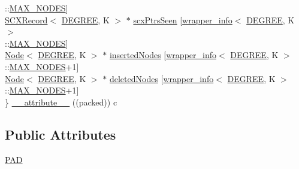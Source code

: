 \begin{DoxyCompactItemize}
\begin{tabbing}
\>\>::\hyperlink{scxrecord_8h_abd2aacdca9cb2a1a30f3392256b96ea3}{MAX\_NODES}\mbox{]}\\
\>\hyperlink{structabtree__ns_1_1SCXRecord}{SCXRecord}$<$ \hyperlink{brown__sigouin__abtree__kcas_2adapter_8h_a5d88b17d70c985f2f2b8e987037fd6dd}{DEGREE}, K $>$ $\ast$ \hyperlink{structabtree__ns_1_1SCXRecord_a97a778327a41a8e715c36a22332832cb}{scxPtrsSeen} \mbox{[}\hyperlink{classabtree__ns_1_1wrapper__info}{wrapper\_info}$<$ \hyperlink{brown__sigouin__abtree__kcas_2adapter_8h_a5d88b17d70c985f2f2b8e987037fd6dd}{DEGREE}, K $>$\\
\>\>::\hyperlink{scxrecord_8h_abd2aacdca9cb2a1a30f3392256b96ea3}{MAX\_NODES}\mbox{]}\\
\>\hyperlink{structabtree__ns_1_1Node}{Node}$<$ \hyperlink{brown__sigouin__abtree__kcas_2adapter_8h_a5d88b17d70c985f2f2b8e987037fd6dd}{DEGREE}, K $>$ $\ast$ \hyperlink{structabtree__ns_1_1SCXRecord_a2ce2551c790644f88f8f57d4afbfc2ae}{insertedNodes} \mbox{[}\hyperlink{classabtree__ns_1_1wrapper__info}{wrapper\_info}$<$ \hyperlink{brown__sigouin__abtree__kcas_2adapter_8h_a5d88b17d70c985f2f2b8e987037fd6dd}{DEGREE}, K $>$\\
\>\>::\hyperlink{scxrecord_8h_abd2aacdca9cb2a1a30f3392256b96ea3}{MAX\_NODES}+1\mbox{]}\\
\>\hyperlink{structabtree__ns_1_1Node}{Node}$<$ \hyperlink{brown__sigouin__abtree__kcas_2adapter_8h_a5d88b17d70c985f2f2b8e987037fd6dd}{DEGREE}, K $>$ $\ast$ \hyperlink{structabtree__ns_1_1SCXRecord_ab66bafb4bde78a1e5e7fac9631fdce22}{deletedNodes} \mbox{[}\hyperlink{classabtree__ns_1_1wrapper__info}{wrapper\_info}$<$ \hyperlink{brown__sigouin__abtree__kcas_2adapter_8h_a5d88b17d70c985f2f2b8e987037fd6dd}{DEGREE}, K $>$\\
\>\>::\hyperlink{scxrecord_8h_abd2aacdca9cb2a1a30f3392256b96ea3}{MAX\_NODES}+1\mbox{]}\\
\} \hyperlink{structabtree__ns_1_1SCXRecord_a42549d20c90adbf96ebd6bcc83837fd0}{\_\_attribute\_\_} ((packed)) c\\

\end{tabbing}\end{DoxyCompactItemize}
\subsection*{Public Attributes}
\begin{DoxyCompactItemize}
\item 
\hyperlink{structabtree__ns_1_1SCXRecord_ac9350d5dbd8d8831c302bad62d5e31bc}{P\+AD}
\end{DoxyCompactItemize}
